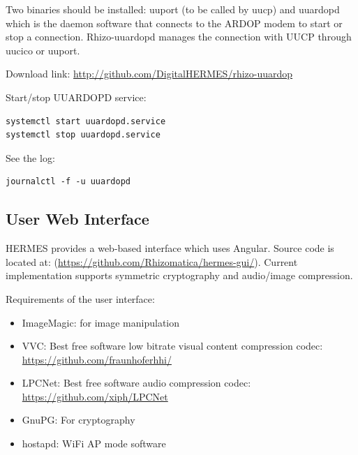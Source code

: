 \documentclass[11pt,a4paper]{article}
\begin{document}

Two binaries should be installed: uuport (to be called by uucp) and uuardopd
which is the daemon software that connects to the ARDOP modem to start
or stop a connection. Rhizo-uuardopd manages the connection with UUCP
through uucico or uuport.

Download link: \url{http://github.com/DigitalHERMES/rhizo-uuardop}

Start/stop UUARDOPD service:
\begin{verbatim}
systemctl start uuardopd.service
systemctl stop uuardopd.service
\end{verbatim}


See the log:
\begin{verbatim}
journalctl -f -u uuardopd
\end{verbatim}





\subsection{User Web Interface}

HERMES provides a web-based interface which uses Angular. Source
code is located at:
(\url{https://github.com/Rhizomatica/hermes-gui/}). Current
implementation supports symmetric cryptography and audio/image compression.


Requirements of the user interface:

\begin{itemize}
\item ImageMagic: for image manipulation
\item VVC: Best free software low bitrate visual content compression codec: \url{https://github.com/fraunhoferhhi/}
\item LPCNet: Best free software audio compression codec: \url{https://github.com/xiph/LPCNet}
\item GnuPG: For cryptography
\item hostapd: WiFi AP mode software
\end{itemize}
\end{document}
